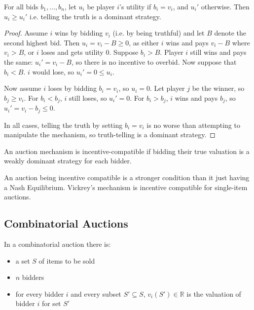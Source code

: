 		\begin{theorem}
			For all bids $b_1, \ldots, b_n$, let $u_i$ be player $i$'s utility
			if $b_i = v_i$, and $u_i'$ otherwise. Then $u_i \ge u_i'$ i.e.
			telling the truth is a dominant strategy.
		\end{theorem}
		\begin{proof}
			Assume $i$ wins by bidding $v_i$ (i.e. by being truthful) and let
			$B$ denote the second highest bid. Then $u_i = v_i - B \ge 0$, as
			either $i$ wins and pays $v_i - B$ where $v_i > B$, or $i$ loses
			and gets utility 0. Suppose $b_i > B$. Player $i$ still wins and
			pays the same: $u_i' = v_i - B$, so there is no incentive to
			overbid. Now suppose that $b_i < B$. $i$ would lose, so $u_i' = 0
			\le u_i$.

			Now assume $i$ loses by bidding $b_i = v_i$, so $u_i = 0$. Let
			player $j$ be the winner, so $b_j \ge v_i$. For $b_i < b_j$, $i$
			still loses, so $u_i' = 0$. For $b_i > b_j$, $i$ wins and pays
			$b_j$, so $u_i' = v_i - b_j \le 0$.

			In all cases, telling the truth by setting $b_i = v_i$ is no worse
			than attempting to manipulate the mechanism, so truth-telling is a
			dominant strategy.
		\end{proof}

		\begin{definition}
			An auction mechanism is incentive-compatible if bidding their true
			valuation is a weakly dominant strategy for each bidder.
		\end{definition}

		An auction being incentive compatible is a stronger condition than it
		just having a Nash Equilibrium. Vickrey's mechanism is incentive
		compatible for single-item auctions.
	
	\subsection{Combinatorial Auctions}
		In a combinatorial auction there is:
		\begin{itemize}
			\itemsep0em
			\item a set $S$ of items to be sold
			\item $n$ bidders
			\item for every bidder $i$ and every subset $S' \subseteq S$,
				$v_i(S') \in \mathbb{R}$ is the valuation of bidder $i$ for set
				$S'$
		\end{itemize}

